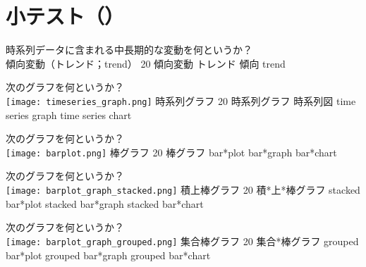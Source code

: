 \newcommand{\Release}{}
\newcommand{\Slide}{}
\newcommand{\PrintLecture}{1}
\newcommand{\PrintSolution}{1}







\maketitle

\section{小テスト（\MyClass）}

\begin{quiz}{\MyClass}

\QuizShortAnswer
{
  時系列データに含まれる中長期的な変動を何というか？\\
}
{
  傾向変動（トレンド；trend）
}
{20}
{傾向変動}
{トレンド}
{傾向}
{trend}

\QuizShortAnswer
{
  次のグラフを何というか？\\
  \texttt{[image: timeseries\_graph.png]}
}
{
  時系列グラフ
}
{20}
{時系列グラフ}
{時系列図}
{time series graph}
{time series chart}

\QuizShortAnswer
{
  次のグラフを何というか？\\
  \texttt{[image: barplot.png]}
}
{
  棒グラフ
}
{20}
{棒グラフ}
{bar*plot}
{bar*graph}
{bar*chart}

\QuizShortAnswer
{
  次のグラフを何というか？\\
  \texttt{[image: barplot\_graph\_stacked.png]}
}
{
  積上棒グラフ
}
{20}
{積*上*棒グラフ}
{stacked bar*plot}
{stacked bar*graph}
{stacked bar*chart}

\QuizShortAnswer
{
  次のグラフを何というか？\\
  \texttt{[image: barplot\_graph\_grouped.png]}
}
{
  集合棒グラフ
}
{20}
{集合*棒グラフ}
{grouped bar*plot}
{grouped bar*graph}
{grouped bar*chart}

\end{quiz}


